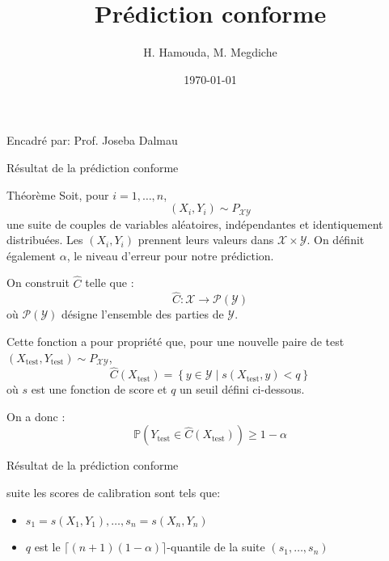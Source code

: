 \documentclass[10pt]{beamer}
\title{Prédiction conforme}
\author{H. Hamouda, M. Megdiche}
\institute{Institut National des Sciences Appliquées de Toulouse \\ 3MIC-MA}
\date{\today}
\begin{document}
\begin{frame}
  \titlepage
  \vspace{1cm}
  {\small \centering Encadré par: Prof. Joseba Dalmau \par}
\end{frame}




\begin{frame}{Résultat de la prédiction conforme}
\small
\begin{block}{Théorème}
Soit, pour $i = 1, \ldots, n$,
\[
(X_i, Y_i) \sim P_{\mathcal{X}\mathcal{Y}}
\]
une suite de couples de variables aléatoires, indépendantes et identiquement distribuées. Les $(X_i, Y_i)$ prennent leurs valeurs dans $\mathcal{X} \times \mathcal{Y}$. On définit également $\alpha$, le niveau d'erreur pour notre prédiction.

On construit $\hat{C}$ telle que :
\[
\hat{C} : \mathcal{X} \to \mathcal{P}(\mathcal{Y})
\]
où $\mathcal{P}(\mathcal{Y})$ désigne l'ensemble des parties de $\mathcal{Y}$.

Cette fonction a pour propriété que, pour une nouvelle paire de test $(X_{\text{test}}, Y_{\text{test}}) \sim P_{\mathcal{X}\mathcal{Y}}$,
\[
\hat{C}(X_{\text{test}}) = \left\{ y \in \mathcal{Y} \mid s(X_{\text{test}}, y) < q \right\}
\]
où $s$ est une fonction de score et $q$ un seuil défini ci-dessous.

On a donc :
\[
\mathbb{P}\left( Y_{\text{test}} \in \hat{C}(X_{\text{test}}) \right) \geq 1 - \alpha
\]
\end{block}
\end{frame}

\begin{frame}{Résultat de la prédiction conforme}
\begin{block}{suite}
les scores de calibration sont tels que:
\begin{itemize}
    \item $s_1 = s(X_1, Y_1), \ldots, s_n = s(X_n, Y_n)$
    \item $q$ est le $\lceil (n+1)(1-\alpha) \rceil$-quantile de la suite $(s_1, \ldots, s_n)$
\end{itemize}
\end{block}
\end{frame}

\end{document}

